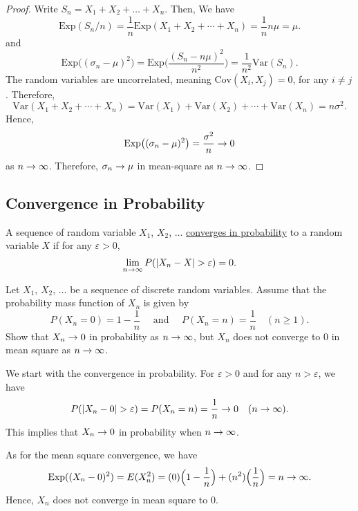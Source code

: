 \begin{proof}
Write $S_n = X_1 + X_2 + \ldots + X_n$. Then,
We have
    \[
        \mathrm{Exp} (S_n /n) = \frac{1}{n} \mathrm{Exp} (X_1 + X_2 + \cdots + X_n ) = \frac{1}{n}n \mu = \mu .
    \]
and
    \[
        \mathrm{Exp} \big( (\sigma_n - \mu )^2 \big) = \mathrm{Exp} \Big( \frac{(S_n - n \mu)^2}{n^2} \Big) = \frac{1}{n^2} \mathrm{Var} (S_n ) .
    \]
The random variables are uncorrelated, meaning $\mathrm{Cov} (X_i, X_j ) = 0$, for any $i \neq j$. Therefore,
    \[
        \mathrm{Var} (X_1 + X_2 + \cdots + X_n ) = \mathrm{Var} (X_1) + \mathrm{Var} (X_2) + \cdots + \mathrm{Var} (X_n ) = n \sigma^2 .
    \]
Hence,
    \[
        \mathrm{Exp} \big( (\sigma_n - \mu )^2 \big) = \frac{\sigma^2}{n} \rightarrow 0
    \]
as $n \rightarrow \infty$. Therefore, $\sigma_n \rightarrow \mu$ in mean-square as $n \rightarrow \infty$.
\end{proof}

\subsection*{Convergence in Probability}

\begin{definition}
A sequence of random variable $X_1$, $X_2$, $\ldots$ \underline{converges in probability} to a random variable $X$ if for any $\varepsilon > 0$, 
    \[
        \lim_{n \rightarrow \infty} P (|X_n - X| > \varepsilon ) = 0 .
   \]
\end{definition}

\begin{example}
Let $X_1$, $X_2$, $\ldots$ be a sequence of discrete random variables. Assume that the probability mass function of $X_n$ is given by
    \[
        P (X_n = 0) = 1 - \frac{1}{n} \quad \text{ and } \quad P (X_n = n ) = \frac{1}{n} \quad (n \geq 1) .
    \]
Show that $X_n \rightarrow 0$ in probability as $n \rightarrow \infty$, but $X_n$ does not converge to $0$ in mean square as $n \rightarrow \infty$.
\end{example}

\begin{sol*}
We start with the convergence in probability. For $\varepsilon > 0$ and for any $n > \varepsilon$, we have
    \[
        P (|X_n - 0| > \varepsilon ) = P (X_n = n) = \frac{1}{n} \rightarrow 0 \quad (n \rightarrow \infty ). 
    \]
This implies that $X_n \rightarrow 0$ in probability when $n \rightarrow \infty$. 

As for the mean square convergence, we have
    \[
        \mathrm{Exp} ( (X_n - 0)^2) = E (X_n^2) = (0) \Big( 1 - \frac{1}{n} \Big) + (n^2) \Big( \frac{1}{n} \Big) = n \rightarrow \infty .
    \]
Hence, $X_n$ does not converge in mean square to $0$. 
\end{sol*}

